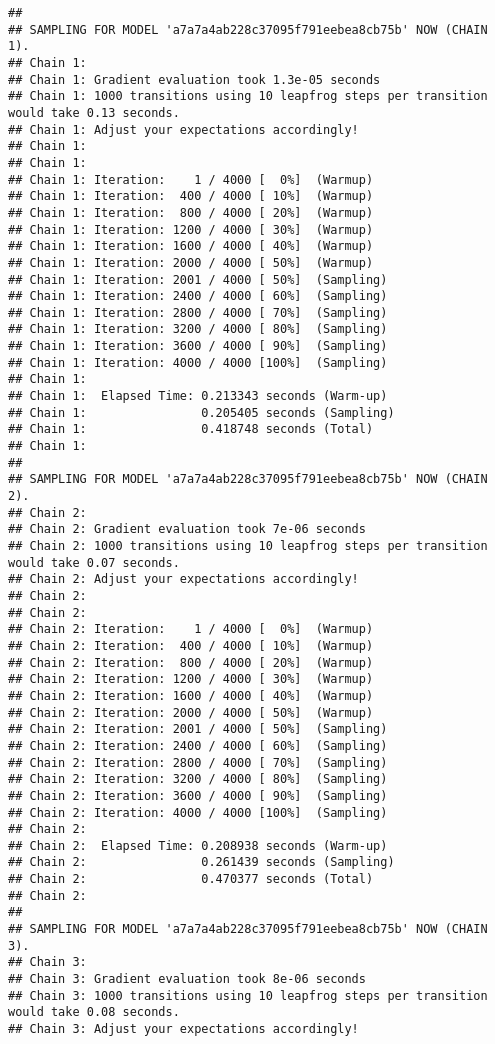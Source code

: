 \documentclass[]{article}
\begin{document}
\begin{verbatim}
## 
## SAMPLING FOR MODEL 'a7a7a4ab228c37095f791eebea8cb75b' NOW (CHAIN 1).
## Chain 1: 
## Chain 1: Gradient evaluation took 1.3e-05 seconds
## Chain 1: 1000 transitions using 10 leapfrog steps per transition would take 0.13 seconds.
## Chain 1: Adjust your expectations accordingly!
## Chain 1: 
## Chain 1: 
## Chain 1: Iteration:    1 / 4000 [  0%]  (Warmup)
## Chain 1: Iteration:  400 / 4000 [ 10%]  (Warmup)
## Chain 1: Iteration:  800 / 4000 [ 20%]  (Warmup)
## Chain 1: Iteration: 1200 / 4000 [ 30%]  (Warmup)
## Chain 1: Iteration: 1600 / 4000 [ 40%]  (Warmup)
## Chain 1: Iteration: 2000 / 4000 [ 50%]  (Warmup)
## Chain 1: Iteration: 2001 / 4000 [ 50%]  (Sampling)
## Chain 1: Iteration: 2400 / 4000 [ 60%]  (Sampling)
## Chain 1: Iteration: 2800 / 4000 [ 70%]  (Sampling)
## Chain 1: Iteration: 3200 / 4000 [ 80%]  (Sampling)
## Chain 1: Iteration: 3600 / 4000 [ 90%]  (Sampling)
## Chain 1: Iteration: 4000 / 4000 [100%]  (Sampling)
## Chain 1: 
## Chain 1:  Elapsed Time: 0.213343 seconds (Warm-up)
## Chain 1:                0.205405 seconds (Sampling)
## Chain 1:                0.418748 seconds (Total)
## Chain 1: 
## 
## SAMPLING FOR MODEL 'a7a7a4ab228c37095f791eebea8cb75b' NOW (CHAIN 2).
## Chain 2: 
## Chain 2: Gradient evaluation took 7e-06 seconds
## Chain 2: 1000 transitions using 10 leapfrog steps per transition would take 0.07 seconds.
## Chain 2: Adjust your expectations accordingly!
## Chain 2: 
## Chain 2: 
## Chain 2: Iteration:    1 / 4000 [  0%]  (Warmup)
## Chain 2: Iteration:  400 / 4000 [ 10%]  (Warmup)
## Chain 2: Iteration:  800 / 4000 [ 20%]  (Warmup)
## Chain 2: Iteration: 1200 / 4000 [ 30%]  (Warmup)
## Chain 2: Iteration: 1600 / 4000 [ 40%]  (Warmup)
## Chain 2: Iteration: 2000 / 4000 [ 50%]  (Warmup)
## Chain 2: Iteration: 2001 / 4000 [ 50%]  (Sampling)
## Chain 2: Iteration: 2400 / 4000 [ 60%]  (Sampling)
## Chain 2: Iteration: 2800 / 4000 [ 70%]  (Sampling)
## Chain 2: Iteration: 3200 / 4000 [ 80%]  (Sampling)
## Chain 2: Iteration: 3600 / 4000 [ 90%]  (Sampling)
## Chain 2: Iteration: 4000 / 4000 [100%]  (Sampling)
## Chain 2: 
## Chain 2:  Elapsed Time: 0.208938 seconds (Warm-up)
## Chain 2:                0.261439 seconds (Sampling)
## Chain 2:                0.470377 seconds (Total)
## Chain 2: 
## 
## SAMPLING FOR MODEL 'a7a7a4ab228c37095f791eebea8cb75b' NOW (CHAIN 3).
## Chain 3: 
## Chain 3: Gradient evaluation took 8e-06 seconds
## Chain 3: 1000 transitions using 10 leapfrog steps per transition would take 0.08 seconds.
## Chain 3: Adjust your expectations accordingly!

\end{verbatim}
\end{document}
